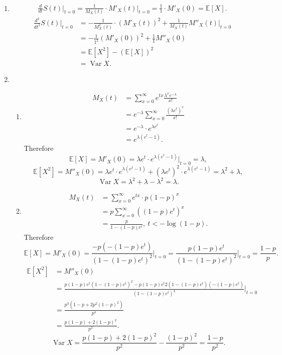 \documentclass{article}
\DeclareMathOperator{\var}{Var}
\begin{document}
\begin{enumerate}
    \item \begin{align*}
        \frac{d}{dt} S(t) \Big|_{t = 0}
        = \frac{1}{M_X(t)} \cdot M'_X(t) \Big|_{t = 0}
        = \frac{1}{1} \cdot M'_X(0) 
        = \mathbb{E}[X].
    \end{align*}
    \begin{align*}
        \frac{d^2}{dt^2} S(t) \Big|_{t = 0} 
        &= -\frac{1}{M_X^2(t)} \cdot (M'_X(t))^2 + \frac{1}{M_X(t)} M''_X(t) \Big|_{t = 0} \\
        &= -\frac{1}{1^2} (M'_X(0))^2 + \frac{1}{1} M''_X(0) \\
        &= \mathbb{E}[X^2] - (\mathbb{E}[X])^2 \\
        &= \var{X}.
    \end{align*}

    \item \begin{enumerate}
        \item \begin{align*}
            M_X(t) 
            &= \sum_{x = 0}^{\infty} e^{tx} \frac{\lambda^x e^{-\lambda}}{x!} \\
            &= e^{-\lambda} \sum_{x = 0}^{\infty} \frac{(\lambda e^t)^x}{x!} \\
            &= e^{-\lambda} \cdot e^{\lambda e^t} \\
            &= e^{\lambda (e^t - 1)}.
        \end{align*}
        Therefore 
        \[ \mathbb{E}[X] = M'_X(0) = \lambda e^t \cdot e^{\lambda (e^t - 1)} |_{t = 0} = \lambda, \]
        \[ \mathbb{E}[X^2] = M''_X(0) = \lambda e^t \cdot e^{\lambda (e^t - 1)} 
        + (\lambda e^t)^2 \cdot e^{\lambda (e^t - 1)} = \lambda^2 + \lambda, \]
        \[ \var{X} = \lambda^2 + \lambda - \lambda^2 = \lambda. \]

        \item \begin{align*}
            M_X(t)
            &= \sum_{x = 0}^{\infty} e^{tx} \cdot p(1 - p)^x \\
            &= p \sum_{x = 0}^{\infty} ((1 - p)e^t)^x \\
            &= \frac{p}{1 - (1 - p)e^t}, \ t < -\log(1 - p).
        \end{align*}
        Therefore 
        \[ \mathbb{E}[X] = M'_X(0) = \frac{-p(-(1 - p)e^t)}{(1 - (1 - p)e^t)^2} \Big|_{t = 0} 
        = \frac{p(1 - p)e^t}{(1 - (1 - p)e^t)^2} \Big|_{t = 0} = \frac{1 - p}{p}. \]
        \begin{align*}
            \mathbb{E}[X^2] 
            &= M''_X(0) \\
            &= \frac{p(1 - p)e^t (1 - (1 - p)e^t)^2 - p(1 - p)e^t 2(1 - (1 - p)e^t) 
            (-(1 - p)e^t)}{(1 - (1 - p)e^t)^4} \Big|_{t = 0} \\
            &= \frac{p^3(1 - p + 2p^2(1 - p)^2)}{p^4} \\
            &= \frac{p(1 - p) + 2(1 - p)^2}{p^2}.
        \end{align*}
        \[ \var{X} = \frac{p(1 - p) + 2(1 - p)^2}{p^2} - \frac{(1 - p)^2}{p^2} = \frac{1 - p}{p^2}. \]


\end{enumerate}
\end{enumerate}
\end{document}
